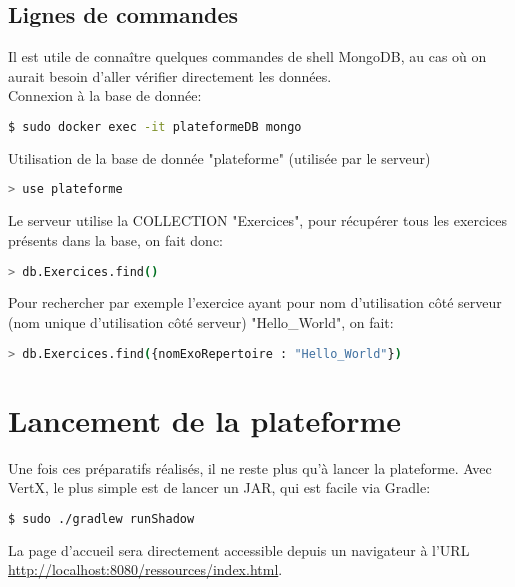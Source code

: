 \documentclass[a4paper]{article}
\begin{document}
\subsection{Lignes de commandes}
Il est utile de connaître quelques commandes de shell MongoDB, au cas où on aurait besoin d'aller vérifier directement les données.\\
Connexion à la base de donnée:
\begin{lstlisting}[language=bash]
  $ sudo docker exec -it plateformeDB mongo
\end{lstlisting}
Utilisation de la base de donnée "plateforme" (utilisée par le serveur)
\begin{lstlisting}[language=bash]
  > use plateforme
\end{lstlisting}
Le serveur utilise la COLLECTION "Exercices", pour récupérer tous les exercices présents dans la base, on fait donc:
\begin{lstlisting}[language=bash]
  > db.Exercices.find()
\end{lstlisting}
Pour rechercher par exemple l'exercice ayant pour nom d'utilisation côté serveur (nom unique d'utilisation côté serveur) "Hello\_World", on fait:
\begin{lstlisting}[language=bash]
  > db.Exercices.find({nomExoRepertoire : "Hello_World"})
\end{lstlisting}

\section{Lancement de la plateforme}
Une fois ces préparatifs réalisés, il ne reste plus qu'à lancer la plateforme. Avec VertX, le plus simple est de lancer un JAR, qui est facile via Gradle:
\begin{lstlisting}[language=bash]
  $ sudo ./gradlew runShadow
\end{lstlisting}
La page d'accueil sera directement accessible depuis un navigateur à l'URL \url{http://localhost:8080/ressources/index.html}.
\end{document}
